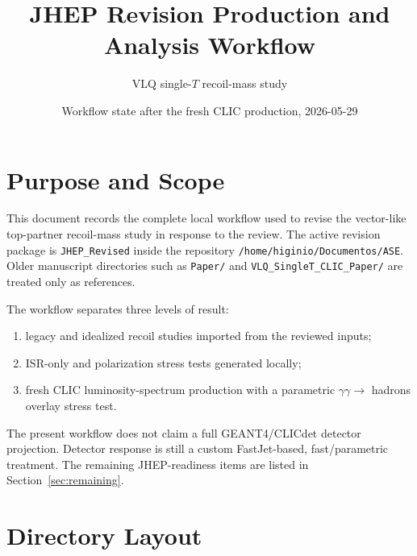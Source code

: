 \documentclass[11pt]{article}
\title{JHEP Revision Production and Analysis Workflow}
\author{VLQ single-$T$ recoil-mass study}
\date{Workflow state after the fresh CLIC production, 2026-05-29}
\newcommand{\repo}{\texttt{/home/higinio/Documentos/ASE}}
\newcommand{\rev}{\texttt{JHEP\_Revised}}
\begin{document}
\maketitle
\tableofcontents

\section{Purpose and Scope}

This document records the complete local workflow used to revise the vector-like
top-partner recoil-mass study in response to the review.  The active revision
package is \rev{} inside the repository \repo{}.  Older manuscript directories
such as \texttt{Paper/} and \texttt{VLQ\_SingleT\_CLIC\_Paper/} are treated only
as references.

The workflow separates three levels of result:
\begin{enumerate}
  \item legacy and idealized recoil studies imported from the reviewed inputs;
  \item ISR-only and polarization stress tests generated locally;
  \item fresh CLIC luminosity-spectrum production with a parametric
        $\gamma\gamma\to$ hadrons overlay stress test.
\end{enumerate}

The present workflow does not claim a full GEANT4/CLICdet detector projection.
Detector response is still a custom FastJet-based, fast/parametric treatment.
The remaining JHEP-readiness items are listed in Section~\ref{sec:remaining}.

\section{Directory Layout}
\end{document}
